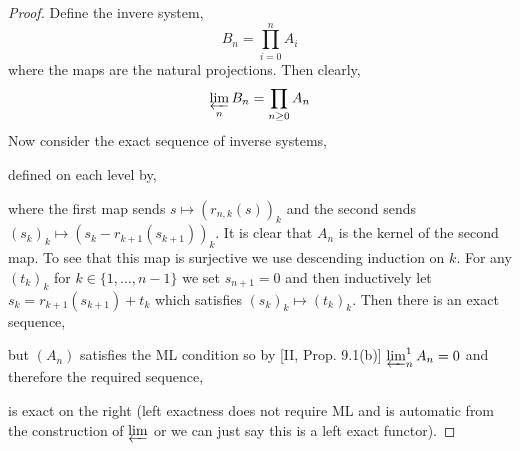 \documentclass[12pt]{article}
\begin{document}
\begin{enumerate}
\begin{proof}
Define the invere system,
\[ B_n = \prod_{i = 0}^n A_i \]
where the maps are the natural projections. Then clearly,
\[ \varprojlim_n B_n = \prod_{n \ge 0} A_n \]
Now consider the exact sequence of inverse systems,
\begin{center}
\end{center}
defined on each level by,
\begin{center}
\end{center}
where the first map sends $s \mapsto (r_{n,k}(s))_k$ and the second sends $(s_k)_k \mapsto (s_k - r_{k+1}(s_{k+1}))_k$. It is clear that $A_n$ is the kernel of the second map. To see that this map is surjective we use descending induction on $k$. For any $(t_k)_{k}$ for $k \in \{1, \dots, n-1 \}$ we set $s_{n+1} = 0$ and then inductively let $s_k = r_{k+1}(s_{k+1}) + t_k$ which satisfies $(s_k)_k \mapsto (t_k)_k$. Then there is an exact sequence,
\begin{center}
\end{center}
but $(A_n)$ satisfies the ML condition so by [II, Prop. 9.1(b)] $\varprojlim_n^{1} A_n = 0$ and therefore the required sequence,
\begin{center}
\end{center}
is exact on the right (left exactness does not require ML and is automatic from the construction of $\varprojlim$ or we can just say this is a left exact functor).
\end{proof}


\end{enumerate}
\end{document}
